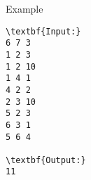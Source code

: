 Example
\begin{verbatim}
\textbf{Input:}
6 7 3
1 2 3
1 2 10
1 4 1
4 2 2
2 3 10
5 2 3
6 3 1
5 6 4

\textbf{Output:}
11

\end{verbatim}